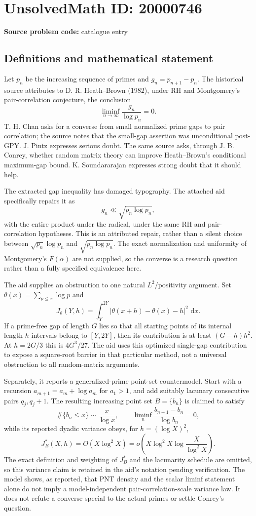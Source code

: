 \documentclass[11pt]{article}
\newcommand{\dd}{\,\mathrm{d}}
\begin{document}
\section*{UnsolvedMath ID: 20000746}
\textbf{Source problem code:} catalogue entry
\subsection{Definitions and mathematical statement}
Let $p_n$ be the increasing sequence of primes and $g_n=p_{n+1}-p_n$. The historical source attributes to D. R. Heath--Brown (1982), under RH and Montgomery's pair-correlation conjecture, the conclusion
\[
\liminf_{n\to\infty}\frac{g_n}{\log p_n}=0.
\]
T. H. Chan asks for a converse from small normalized prime gaps to pair correlation; the source notes that the small-gap assertion was unconditional post-GPY. J. Pintz expresses serious doubt. The same source asks, through J. B. Conrey, whether random matrix theory can improve Heath--Brown's conditional maximum-gap bound. K. Soundararajan expresses strong doubt that it should help.

The extracted gap inequality has damaged typography. The attached aid specifically repairs it as
\[
g_n\ll\sqrt{p_n\log p_n},
\]
with the entire product under the radical, under the same RH and pair-correlation hypotheses. This is an attributed repair, rather than a silent choice between $\sqrt{p_n}\log p_n$ and $\sqrt{p_n\log p_n}$. The exact normalization and uniformity of Montgomery's $F(\alpha)$ are not supplied, so the converse is a research question rather than a fully specified equivalence here.

The aid supplies an obstruction to one natural $L^2$/positivity argument. Set $\theta(x)=\sum_{p\le x}\log p$ and
\[
J_\theta(Y,h)=\int_Y^{2Y}|\theta(x+h)-\theta(x)-h|^2\,\dd x.
\]
If a prime-free gap of length $G$ lies so that all starting points of its internal length-$h$ intervals belong to $[Y,2Y]$, then its contribution is at least $(G-h)h^2$. At $h=2G/3$ this is $4G^3/27$. The aid uses this optimized single-gap contribution to expose a square-root barrier in that particular method, not a universal obstruction to all random-matrix arguments.

Separately, it reports a generalized-prime point-set countermodel. Start with a recursion $a_{m+1}=a_m+\log a_m$ for $a_1>1$, and add suitably lacunary consecutive pairs $q_j,q_j+1$. The resulting increasing point set $B=\{b_n\}$ is claimed to satisfy
\[
\#\{b_n\le x\}\sim\frac{x}{\log x},\qquad
\liminf_n\frac{b_{n+1}-b_n}{\log b_n}=0,
\]
while its reported dyadic variance obeys, for $h=(\log X)^2$,
\[
J_B^*(X,h)=O(X\log^2X)
=o\left(X\log^2X\log\frac{X}{\log^2X}\right).
\]
The exact definition and weighting of $J_B^*$ and the lacunarity schedule are omitted, so this variance claim is retained in the aid's notation pending verification. The model shows, as reported, that PNT density and the scalar liminf statement alone do not imply a model-independent pair-correlation-scale variance law. It does not refute a converse special to the actual primes or settle Conrey's question.
\end{document}
